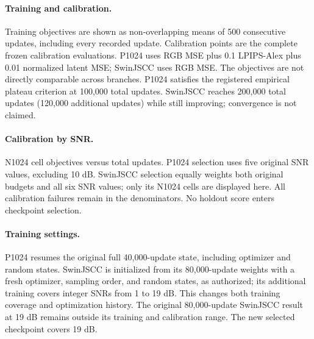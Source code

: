 \paragraph{Training and calibration.} Training objectives are shown as non-overlapping means of 500 consecutive updates, including every recorded update. Calibration points are the complete frozen calibration evaluations. P1024 uses RGB MSE plus 0.1 LPIPS-Alex plus 0.01 normalized latent MSE; SwinJSCC uses RGB MSE. The objectives are not directly comparable across branches. P1024 satisfies the registered empirical plateau criterion at 100,000 total updates. SwinJSCC reaches 200,000 total updates (120,000 additional updates) while still improving; convergence is not claimed.

\paragraph{Calibration by SNR.} N1024 cell objectives versus total updates. P1024 selection uses five original SNR values, excluding 10 dB. SwinJSCC selection equally weights both original budgets and all six SNR values; only its N1024 cells are displayed here. All calibration failures remain in the denominators. No holdout score enters checkpoint selection.

\paragraph{Training settings.} P1024 resumes the original full 40,000-update state, including optimizer and random states. SwinJSCC is initialized from its 80,000-update weights with a fresh optimizer, sampling order, and random states, as authorized; its additional training covers integer SNRs from 1 to 19 dB. This changes both training coverage and optimization history. The original 80,000-update SwinJSCC result at 19 dB remains outside its training and calibration range. The new selected checkpoint covers 19 dB.
